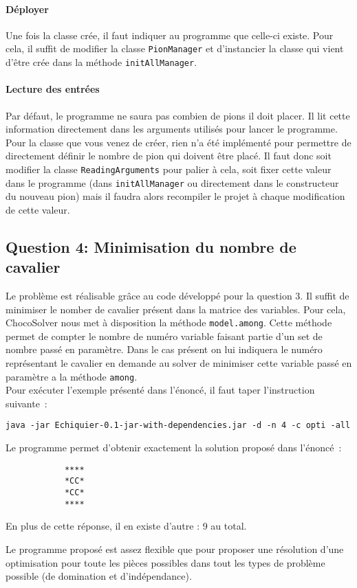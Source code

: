 \documentclass[a4paper,11pt]{article}
\begin{document}
            \paragraph{Déployer}
                Une fois la classe crée, il faut indiquer au programme que celle-ci existe. Pour cela, il suffit de modifier la classe \verb|PionManager| et d'instancier la classe qui vient d'être crée dans la méthode \verb|initAllManager|.

            \paragraph{Lecture des entrées}
                Par défaut, le programme ne saura pas combien de pions il doit placer.  Il lit cette information directement dans les arguments utilisés pour lancer le programme.  Pour la classe que vous venez de créer, rien n'a été implémenté pour permettre de directement définir le nombre de pion qui doivent être placé. Il faut donc soit modifier la classe \verb|ReadingArguments| pour palier à cela, soit fixer cette valeur dans le programme (dans \verb|initAllManager| ou directement dans le constructeur du nouveau pion) mais il faudra alors recompiler le projet à chaque modification de cette valeur.
      
    \subsection{Question 4: Minimisation du nombre de cavalier}
        Le problème est réalisable grâce au code développé pour la question 3.  Il suffit de minimiser le nomber de cavalier présent dans la matrice des variables.  Pour cela, ChocoSolver nous met à disposition la méthode \verb|model.among|.  Cette méthode permet de compter le nombre de numéro variable faisant partie d'un set de nombre passé en paramètre.  Dans le cas présent on lui indiquera le numéro représentant le cavalier en demande au solver de minimiser cette variable passé en paramètre a la méthode \verb|among|.\\
        Pour exécuter l'exemple présenté dans l'énoncé, il faut taper l'instruction suivante~:
        \begin{verbatim}
java -jar Echiquier-0.1-jar-with-dependencies.jar -d -n 4 -c opti -all
        \end{verbatim}
        Le programme permet d'obtenir exactement la solution proposé dans l'énoncé~:
        \begin{verbatim}
            ****
            *CC*
            *CC*
            ****
        \end{verbatim}
        En plus de cette réponse, il en existe d'autre : 9 au total.\\
        \begin{tcolorbox}[title=Remarque :]
            Le programme proposé est assez flexible que pour proposer une résolution d'une optimisation pour toute les pièces possibles dans tout les types de problème possible (de domination et d'indépendance).
        \end{tcolorbox}
    
\end{document}
